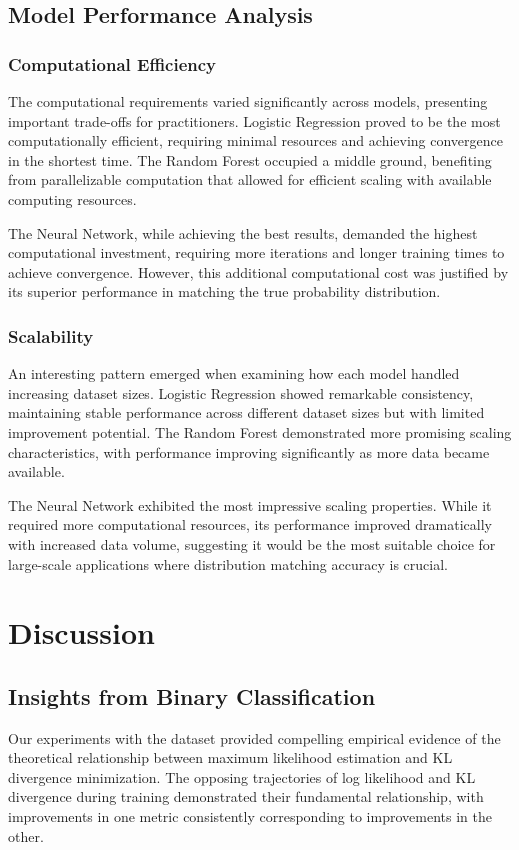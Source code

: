 \documentclass[preprint,12pt]{elsarticle}
\begin{document}
\subsection{Model Performance Analysis}
\subsubsection{Computational Efficiency}
The computational requirements varied significantly across models, presenting important trade-offs for practitioners. Logistic Regression proved to be the most computationally efficient, requiring minimal resources and achieving convergence in the shortest time. The Random Forest occupied a middle ground, benefiting from parallelizable computation that allowed for efficient scaling with available computing resources.

The Neural Network, while achieving the best results, demanded the highest computational investment, requiring more iterations and longer training times to achieve convergence. However, this additional computational cost was justified by its superior performance in matching the true probability distribution.

\subsubsection{Scalability}
An interesting pattern emerged when examining how each model handled increasing dataset sizes. Logistic Regression showed remarkable consistency, maintaining stable performance across different dataset sizes but with limited improvement potential. The Random Forest demonstrated more promising scaling characteristics, with performance improving significantly as more data became available.

The Neural Network exhibited the most impressive scaling properties. While it required more computational resources, its performance improved dramatically with increased data volume, suggesting it would be the most suitable choice for large-scale applications where distribution matching accuracy is crucial.

\section{Discussion}
\subsection{Insights from Binary Classification}
Our experiments with the dataset provided compelling empirical evidence of the theoretical relationship between maximum likelihood estimation and KL divergence minimization. The opposing trajectories of log likelihood and KL divergence during training demonstrated their fundamental relationship, with improvements in one metric consistently corresponding to improvements in the other. 
\end{document}
